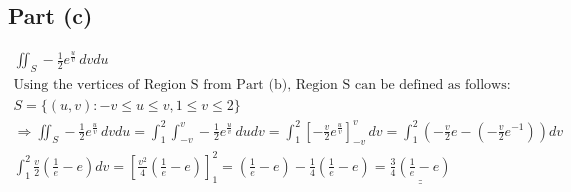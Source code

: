 \documentclass[letterpaper,10pt]{article}
\newcommand{\doubleu}[1]{\underline{\underline{#1}}}
\begin{document}
		\subsection{Part (c)}
			\begin{gather*}
				\iint_S -\frac{1}{2} e^{\frac{u}{v}} \, dvdu \\
				\text{Using the vertices of Region S from Part (b), Region S can be defined as follows:} \\
				S = \{ (u,v): -v \leq u \leq v, 1 \leq v \leq 2 \} \\
				\Rightarrow \iint_S -\frac{1}{2} e^{\frac{u}{v}} \, dvdu = \int_1^2\int_{-v}^v -\frac{1}{2} e^{\frac{u}{v}} \, dudv = \int_1^2 \left[ -\frac{v}{2} e^{\frac{u}{v}} \right]_{-v}^{v} \, dv = \int_1^2 \left( -\frac{v}{2}e - \left( -\frac{v}{2} e^{-1} \right) \right)  dv \\
				\int_1^2 \frac{v}{2} \left( \frac{1}{e} - e \right) dv = \left[ \frac{v^2}{4} \left( \frac{1}{e} - e \right) \right]_1^2 = \left( \frac{1}{e} - e \right) - \frac{1}{4} \left( \frac{1}{e} - e \right) = \doubleu{ \frac{3}{4} \left( \frac{1}{e} - e \right) }
			\end{gather*}
\end{document}
